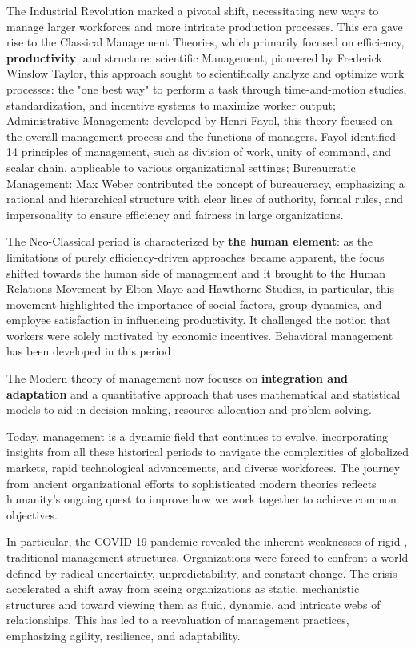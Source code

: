 \documentclass{article}
\begin{document}
The Industrial Revolution marked a pivotal shift, necessitating new ways to manage larger workforces and more intricate production processes. This era gave rise to the Classical Management Theories, which primarily focused on efficiency, \textbf{productivity}, and structure: scientific Management, pioneered by Frederick Winslow Taylor, this approach sought to scientifically analyze and optimize work processes: the "one best way" to perform a task through time-and-motion studies, standardization, and incentive systems to maximize worker output; Administrative Management: developed by Henri Fayol, this theory focused on the overall management process and the functions of managers. Fayol identified 14 principles of management, such as division of work, unity of command, and scalar chain, applicable to various organizational settings; Bureaucratic Management: Max Weber contributed the concept of bureaucracy, emphasizing a rational and hierarchical structure with clear lines of authority, formal rules, and impersonality to ensure efficiency and fairness in large organizations.

The Neo-Classical period is characterized by \textbf{the human element}: as the limitations of purely efficiency-driven approaches became apparent, the focus shifted towards the human side of management and it brought to the Human Relations Movement by Elton Mayo and Hawthorne Studies, in particular, this movement highlighted the importance of social factors, group dynamics, and employee satisfaction in influencing productivity. It challenged the notion that workers were solely motivated by economic incentives. Behavioral management has been developed in this period

The Modern theory of management now focuses on \textbf{integration and adaptation} and a quantitative approach that uses mathematical and statistical models to aid in decision-making, resource allocation and problem-solving.

Today, management is a dynamic field that continues to evolve, incorporating insights from all these historical periods to navigate the complexities of globalized markets, rapid technological advancements, and diverse workforces. The journey from ancient organizational efforts to sophisticated modern theories reflects humanity's ongoing quest to improve how we work together to achieve common objectives.

In particular, the COVID-19 pandemic revealed the inherent weaknesses of rigid \cite{zohar2021zerodistance}, traditional management structures. Organizations were forced to confront a world defined by radical uncertainty, unpredictability, and constant change. The crisis accelerated a shift away from seeing organizations as static, mechanistic structures and toward viewing them as fluid, dynamic, and intricate webs of relationships.  This has led to a reevaluation of management practices, emphasizing agility, resilience, and adaptability.
\end{document}
